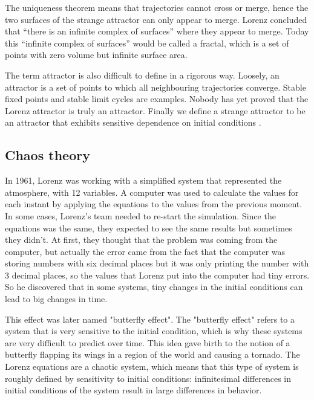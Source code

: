 \documentclass[12pt]{article}
\begin{document}
	\noindent The uniqueness theorem \cite{partie1_ref2} means that trajectories cannot cross or merge, hence the two surfaces of the strange attractor can only appear to merge. Lorenz concluded that “there is an infinite
	complex of surfaces” where they appear to merge. Today this “infinite complex of surfaces” would be called a fractal, which is a set of points with zero volume but infinite surface area.
	
	\noindent The term attractor is also difficult to define in a rigorous way. Loosely, an attractor is a set of points to which all neighbouring trajectories converge. Stable fixed points and
	stable limit cycles are examples. Nobody has yet proved that the Lorenz attractor is truly an attractor. Finally we define a strange attractor to be an attractor that exhibits sensitive dependence on initial conditions \cite{partie1_ref2}.
	
	\subsection{Chaos theory}
	
	In 1961, Lorenz was working with a simplified system that represented the atmosphere, with 12 variables. A computer was used to calculate the values for each instant by applying the equations to the values from the previous moment. In some cases, Lorenz’s team needed to re-start the simulation. Since the equations was the same, they expected to see the same results but sometimes they didn’t. At first, they thought that the problem was coming from the computer, but actually the error came from the fact that the computer was storing numbers with six decimal places but it was only printing the number with 3 decimal places, so the values that Lorenz put into the computer had tiny errors. So he discovered that in some systems, tiny changes in the initial conditions can lead to big changes in time.
	
	\noindent This effect was later named "butterfly effect". The "butterfly effect" refers to a system that is very sensitive to the initial condition, which is why these systems are very difficult to predict over time. This idea gave birth to the notion of a butterfly flapping its wings in a region of the world and causing a tornado.
	The Lorenz equations are a chaotic system, which means that this type of system is roughly defined by sensitivity to initial conditions: infinitesimal differences in initial conditions of the system result in large differences in behavior.
	
\end{document}
